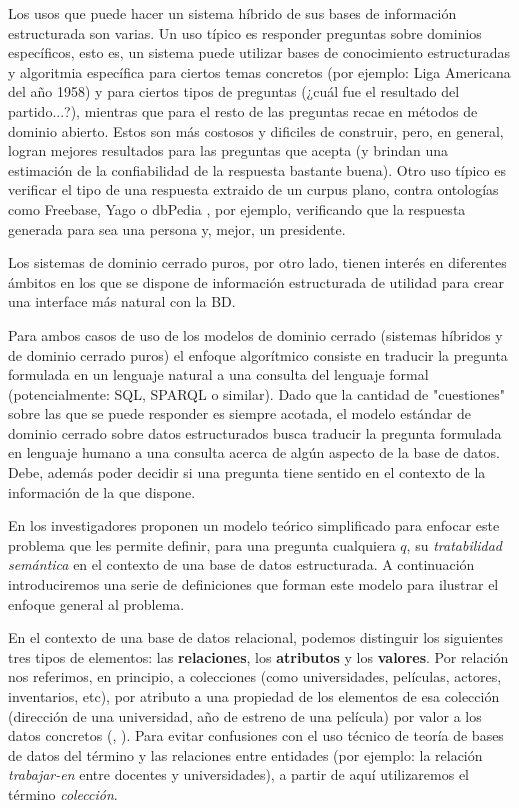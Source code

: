 Los usos que puede hacer un sistema híbrido de sus bases de información estructurada son varias. Un uso típico es responder preguntas sobre dominios específicos, esto es, un sistema puede utilizar bases de conocimiento estructuradas y algoritmia específica para ciertos temas concretos (por ejemplo: Liga Americana del año 1958) y para ciertos tipos de preguntas (¿cuál fue el resultado del partido...?), mientras que para el resto de las preguntas recae en métodos de dominio abierto. Estos  son más costosos y dificiles de construir, pero, en general, logran mejores resultados para las preguntas que acepta (y brindan una estimación de la confiabilidad de la respuesta bastante buena). Otro uso típico es verificar el tipo de una respuesta extraido de un curpus plano, contra ontologías como Freebase, Yago o dbPedia \cite{WATSON2}, por ejemplo, verificando que la respuesta generada para  sea una persona y, mejor, un presidente. 

Los sistemas de dominio cerrado puros, por otro lado, tienen interés en diferentes ámbitos en los que se dispone de información estructurada de utilidad para crear una interface más natural con la BD. %

Para ambos casos de uso de los modelos de dominio cerrado (sistemas híbridos y de dominio cerrado puros) el enfoque algorítmico consiste en traducir la pregunta formulada en un lenguaje natural a una consulta del lenguaje formal (potencialmente: SQL, SPARQL o similar). Dado que la cantidad de "cuestiones" sobre las que se puede responder es siempre acotada, el modelo estándar de dominio cerrado sobre datos estructurados busca traducir la pregunta formulada en lenguaje humano a una consulta acerca de algún aspecto de la base de datos. Debe, además poder decidir si una pregunta tiene sentido en el contexto de la información de la que dispone. 

En \cite{QADB1} los investigadores proponen un modelo teórico simplificado para enfocar este problema que les permite definir, para una pregunta cualquiera $q$, su \textit{tratabilidad semántica} en el contexto de una base de datos estructurada. A continuación introduciremos una serie de definiciones que forman este modelo  para ilustrar el enfoque general al problema. 

En el contexto de una base de datos relacional, podemos distinguir los siguientes tres tipos de elementos: las \textbf{relaciones}, los \textbf{atributos} y los \textbf{valores}. Por relación nos referimos, en principio, a colecciones (como universidades, películas, actores, inventarios, etc), por atributo a una propiedad de los elementos de esa colección (dirección de una universidad, año de estreno de una película) por valor a los datos concretos (, ). Para evitar confusiones con el uso técnico de teoría de bases de datos del término  y las relaciones entre entidades (por ejemplo: la relación \textit{trabajar-en} entre docentes y universidades), a partir de aquí utilizaremos el término \textit{colección}.

